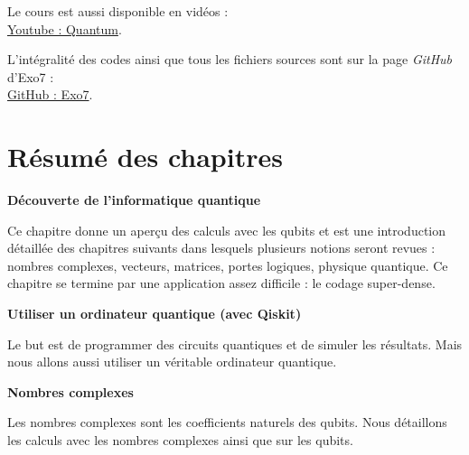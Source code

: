   

\bigskip
\vspace*{\fill}
\begin{center}
    Le cours est aussi disponible en vidéos :\\
    \href{https://www.youtube.com/channel/UCgeO7CtfYSdWt0PPZ3vafqw}
    {Youtube : \og{}Quantum\fg{}}.    
    
L'intégralité des codes \Python{} ainsi que tous les fichiers sources sont sur la page \emph{GitHub} d'Exo7 :\\
\href{https://github.com/exo7math/}{\og{}GitHub : Exo7\fg{}}.
\end{center}





\cleardoublepage
\thispagestyle{empty}
\tableofcontents

\cleardoublepage
\section*{Résumé des chapitres}


\newcommand{\titrechapitre}[1]{{\textbf{#1}}\nopagebreak}
\newcommand{\descriptionchapitre}[1]{%
\smallskip\hfill
\begin{minipage}{0.95\textwidth}\small#1\end{minipage}\medskip\smallskip}


\titrechapitre{Découverte de l'informatique quantique}

\descriptionchapitre{Ce chapitre donne un aperçu des calculs avec les qubits et est une introduction détaillée des chapitres suivants dans lesquels plusieurs notions seront revues : nombres complexes, vecteurs, matrices, portes logiques, physique quantique. Ce chapitre se termine par une application assez difficile : le codage super-dense.}

\titrechapitre{Utiliser un ordinateur quantique (avec Qiskit)}

\descriptionchapitre{Le but est de programmer des circuits quantiques et de simuler les résultats. Mais nous allons aussi utiliser un véritable ordinateur quantique.}

\titrechapitre{Nombres complexes}

\descriptionchapitre{Les nombres complexes sont les coefficients naturels des qubits. Nous détaillons les calculs avec les nombres complexes ainsi que sur les qubits.}

